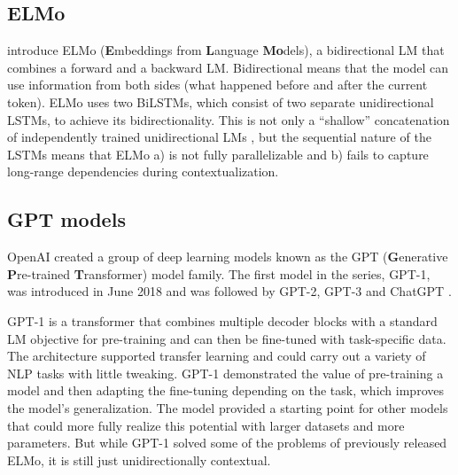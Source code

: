 \subsection{ELMo} \label{elmo}

\citet{peters2018elmo} introduce ELMo (\textbf{E}mbeddings from \textbf{L}anguage \textbf{Mo}dels), a bidirectional LM that combines a forward and a backward LM. Bidirectional means that the model can use information from both sides (what happened before and after the current token). ELMo uses two BiLSTMs, which consist of two separate unidirectional LSTMs, to achieve its bidirectionality. This is not only a ``shallow'' concatenation of independently trained unidirectional LMs \citep{devlin2018bert}, but the sequential nature of the LSTMs means that ELMo a) is not fully parallelizable and b) fails to capture long-range dependencies during contextualization.


\subsection{GPT models} \label{gpt}

OpenAI created a group of deep learning models known as the GPT (\textbf{G}enerative \textbf{P}re-trained \textbf{T}ransformer) model family. The first model in the series, GPT-1, was introduced in June 2018 \citep{radford2018gpt} and was followed by GPT-2, GPT-3 and ChatGPT \citep{radford2019language, brown2020gpt3, chatgpt}.

GPT-1 \citep{radford2018gpt} is a transformer that combines multiple decoder blocks with a standard LM objective for pre-training and can then be fine-tuned with task-specific data. The architecture supported transfer learning and could carry out a variety of NLP tasks with little tweaking. GPT-1 demonstrated the value of pre-training a model and then adapting the fine-tuning depending on the task, which improves the model's generalization. The model provided a starting point for other models that could more fully realize this potential with larger datasets and more parameters. But while GPT-1 solved some of the problems of previously released ELMo, it is still just unidirectionally contextual.

